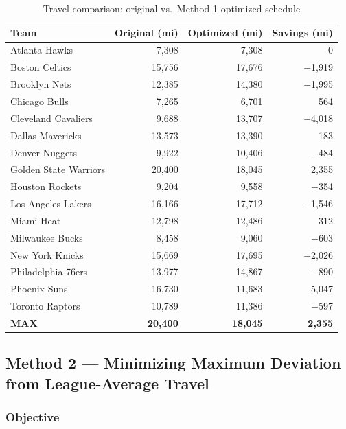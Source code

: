 \documentclass[11pt, letterpaper]{article}
\begin{document}
\begin{table}[h]
\centering
\small
\caption{Travel comparison: original vs.\ Method 1 optimized schedule}
\begin{tabular}{lrrr}
\toprule
\textbf{Team} & \textbf{Original (mi)} & \textbf{Optimized (mi)} & \textbf{Savings (mi)} \\
\midrule
Atlanta Hawks         & 7,308  & 7,308  & 0       \\
Boston Celtics        & 15,756 & 17,676 & $-$1,919 \\
Brooklyn Nets         & 12,385 & 14,380 & $-$1,995 \\
Chicago Bulls         & 7,265  & 6,701  & 564     \\
Cleveland Cavaliers   & 9,688  & 13,707 & $-$4,018 \\
Dallas Mavericks      & 13,573 & 13,390 & 183     \\
Denver Nuggets        & 9,922  & 10,406 & $-$484  \\
Golden State Warriors & 20,400 & 18,045 & 2,355   \\
Houston Rockets       & 9,204  & 9,558  & $-$354  \\
Los Angeles Lakers    & 16,166 & 17,712 & $-$1,546 \\
Miami Heat            & 12,798 & 12,486 & 312     \\
Milwaukee Bucks       & 8,458  & 9,060  & $-$603  \\
New York Knicks       & 15,669 & 17,695 & $-$2,026 \\
Philadelphia 76ers    & 13,977 & 14,867 & $-$890  \\
Phoenix Suns          & 16,730 & 11,683 & 5,047   \\
Toronto Raptors       & 10,789 & 11,386 & $-$597  \\
\midrule
\textbf{MAX}          & \textbf{20,400} & \textbf{18,045} & \textbf{2,355} \\
\bottomrule
\end{tabular}
\end{table}

\subsection{Method 2 --- Minimizing Maximum Deviation from League-Average Travel}

\subsubsection*{Objective}
\end{document}
